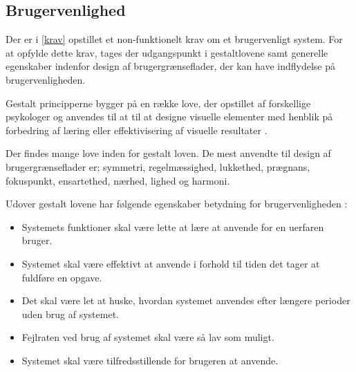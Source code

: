 \subsection{Brugervenlighed}
Der er i \autoref{krav} opstillet et non-funktionelt krav om et brugervenligt system. For at opfylde dette krav, tages der udgangspunkt i gestaltlovene samt generelle egenskaber indenfor design af brugergrænseflader, der kan have indflydelse på brugervenligheden. 

Gestalt principperne bygger på en række love, der opstillet af forskellige psykologer og anvendes til at til at designe visuelle elementer med henblik på forbedring af læring eller effektivisering af visuelle resultater \cite{Chang2002}.

Der findes mange love inden for gestalt loven. De mest anvendte til design af brugergrænseflader er; symmetri, regelmæssighed, lukkethed, prægnans, fokuspunkt, ensartethed, nærhed, lighed og harmoni.\cite{Chang2002}

Udover gestalt lovene har følgende egenskaber betydning for brugervenligheden \cite{ferre2001}:
\begin{itemize}
\item Systemets funktioner skal være lette at lære at anvende for en uerfaren bruger.
\item Systemet skal være effektivt at anvende i forhold til tiden det tager at fuldføre en opgave.
\item Det skal være let at huske, hvordan systemet anvendes efter længere perioder uden brug af systemet.
\item Fejlraten ved brug af systemet skal være så lav som muligt.
\item Systemet skal være tilfredsstillende for brugeren at anvende. 
\end{itemize}
 
 
